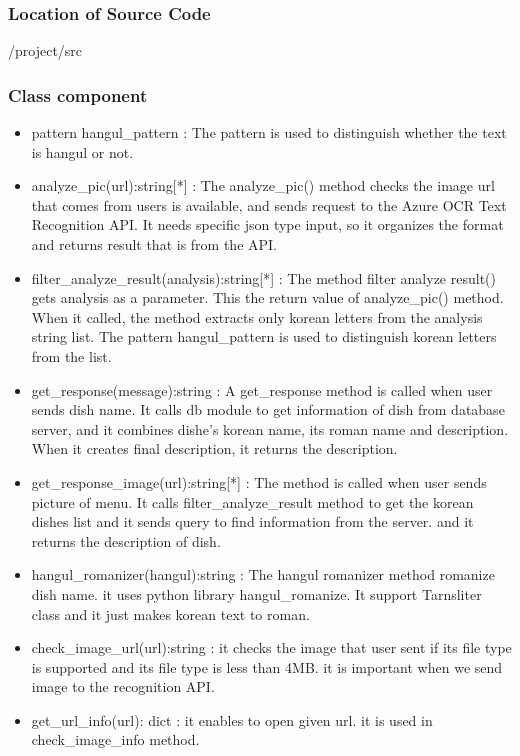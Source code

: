 \subsubsection {Location of Source Code}
/project/src \newline

\subsubsection {Class component}

\begin{itemize}

\item pattern hangul\_pattern : The pattern is used to distinguish whether the text is hangul or not. \newline
\item analyze\_pic(url):string[*] : The analyze\_pic() method checks the image url that comes from users is available, and sends request to the Azure OCR Text Recognition API. It needs specific json type input, so it organizes the format and returns result that is from the API. \newline
\item filter\_analyze\_result(analysis):string[*] : The method filter analyze result() gets analysis as a parameter. This the return value of analyze\_pic() method. When it called, the method extracts only korean letters from the analysis string list. The pattern hangul\_pattern is used to distinguish korean letters from the list. \newline
\item get\_response(message):string : A get\_response method is called when user sends dish name. It calls db module to get information of dish from database server, and it combines dishe's korean name, its roman name and description. When it creates final description, it returns the description. \newline
\item get\_response\_image(url):string[*] : The method is called when user sends picture of menu. It calls filter\_analyze\_result method to get the korean dishes list and it sends query to find information from the server. and it returns the description of dish. \newline
\item hangul\_romanizer(hangul):string : The hangul romanizer method romanize dish name. it uses python library hangul\_romanize. It support Tarnsliter class and it just makes korean text to roman. \newline
\item check\_image\_url(url):string : it checks the image that user sent if its file type is supported and its file type is less than 4MB. it is important when we send image to the recognition API. \newline
\item get\_url\_info(url): dict : it enables to open given url. it is used in check\_image\_info method. \newline
\end{itemize} 

